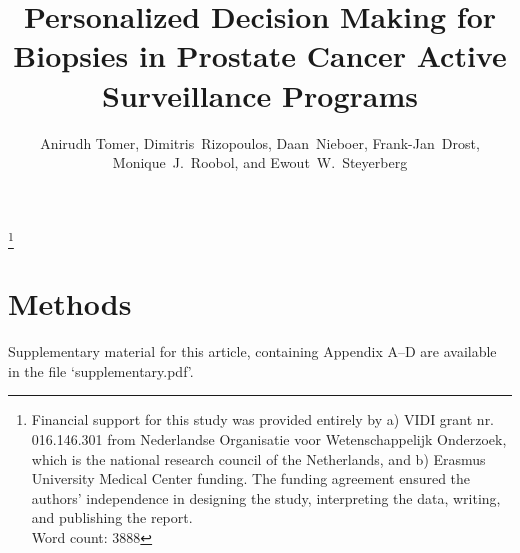 \documentclass[Review,sagev,times]{sagej}
\begin{document}

\title{Personalized Decision Making for Biopsies in Prostate Cancer Active Surveillance Programs}

\author{Anirudh Tomer, Dimitris~Rizopoulos, Daan~Nieboer, Frank-Jan~Drost, Monique~J.~Roobol, and Ewout~W.~Steyerberg}







\maketitle

\footnote{Financial support for this study was provided entirely by a) VIDI grant nr. 016.146.301 from Nederlandse Organisatie voor Wetenschappelijk Onderzoek, which is the national research council of the Netherlands, and b) Erasmus University Medical Center funding. The funding agreement ensured the authors’ independence in designing the study, interpreting the data, writing, and publishing the report.\\Word count: 3888}
\thefootnote



\section{Methods}
\label{sec:methods}











\begin{sm}
Supplementary material for this article, containing Appendix A--D are available in the file `supplementary.pdf'.
\end{sm} 



\end{document}
